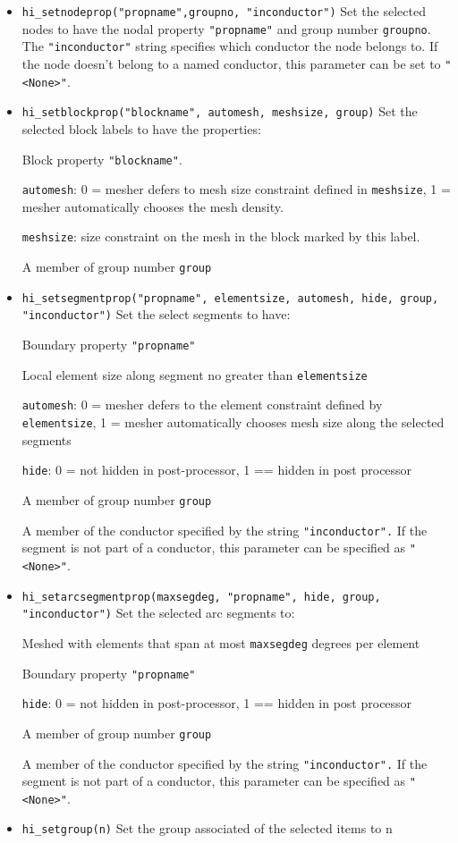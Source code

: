 \begin{itemize}
\item {\tt hi\_setnodeprop("propname",groupno, "inconductor")} Set the selected
nodes to have the nodal property \texttt{"propname"} and group
number \texttt{groupno}. The \texttt{"inconductor"} string
specifies which conductor the node belongs to. If the node doesn't
belong to a named conductor, this parameter can be set to
\texttt{"<None>"}.

\item {\tt hi\_setblockprop("blockname", automesh, meshsize, group)} Set the
selected block labels to have the properties:

Block property \texttt{"blockname"}.

\texttt{automesh}: 0 = mesher defers to mesh size constraint defined in
\texttt{meshsize}, 1 = mesher automatically chooses the mesh density.

\texttt{meshsize}: size constraint on the mesh in the block marked by this
label.

A member of group number \texttt{group}

\item {\tt hi\_setsegmentprop("propname", elementsize, automesh, hide, group,
"inconductor")} Set the select segments to have:

Boundary property \texttt{"propname"}

Local element size along segment no greater than
\texttt{elementsize}

\texttt{automesh}: 0 = mesher defers to the element constraint defined by
\texttt{elementsize}, 1 = mesher automatically chooses mesh size along the
selected segments

\texttt{hide}: 0 = not hidden in post-processor, 1 == hidden in post
processor

A member of group number \texttt{group}

A member of the conductor specified by the string
\texttt{"inconductor".} If the segment is not part of a conductor,
this parameter can be specified as
\texttt{"<None>"}.

\item {\tt hi\_setarcsegmentprop(maxsegdeg, "propname", hide, group,
"inconductor")} Set the selected arc segments to:

Meshed with elements that span at most \texttt{maxsegdeg} degrees
per element

Boundary property \texttt{"propname"}

\texttt{hide}: 0 = not hidden in post-processor, 1 == hidden in post
processor

A member of group number \texttt{group}

A member of the conductor specified by the string
\texttt{"inconductor".} If the segment is not part of a conductor,
this parameter can be specified as
\texttt{"<None>"}.

\item{\tt hi\_setgroup(n)} Set the group associated of the selected items to n

\end{itemize}

